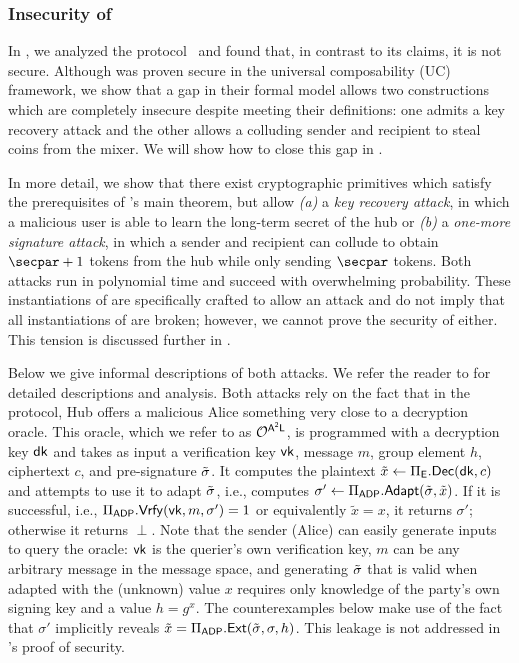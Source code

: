 \subsubsection{Insecurity of \texorpdfstring{\AAL}{A2L}}\label{sec:a2l-attacks}

In \cite{CCS:GMMMTT22}, we analyzed the \AAL protocol~\cite{SP:TaiMorMaf21} and found that, in contrast to its claims, it is not secure. Although \AAL was proven secure in the universal composability (UC)~\cite{FOCS:Canetti01} framework, we show that a gap in their formal model allows two constructions which are completely insecure despite meeting their definitions: one admits a key recovery attack and the other allows a colluding sender and recipient to steal coins from the mixer. We will show how to close this gap in .

In more detail, we show that there exist cryptographic primitives which satisfy the prerequisites of \AAL's main theorem, but allow \textit{(a)} a \emph{key recovery attack}, in which a malicious user is able to learn the long-term secret of the hub or \textit{(b)} a \emph{one-more signature attack}, in which a sender and recipient can collude to obtain $\secpar+1$ tokens from the hub while only sending $\secpar$ tokens. Both attacks run in polynomial time and succeed with overwhelming probability. These instantiations of \AAL are specifically crafted to allow an attack and do not imply that all instantiations of \AAL are broken; however, we cannot prove the security of \AAL either. This tension is discussed further in .

Below we give informal descriptions of both attacks. We refer the reader to \cite{CCS:GMMMTT22} for detailed descriptions and analysis. Both attacks rely on the fact that in the \AAL protocol, Hub offers a malicious Alice something very close to a decryption oracle. This oracle, which we refer to as $\mathcal{O}^{\sf A^2L}$, is programmed with a decryption key $\mathsf{dk}$ and takes as input a verification key $\mathsf{vk}$, message $m$, group element $h$, ciphertext $c$, and pre-signature $\tilde{\sigma}$. It computes the plaintext $\tilde{x} \gets \Pi_{\mathsf{E}}.\mathsf{Dec}(\mathsf{dk}, c)$ and attempts to use it to adapt $\tilde{\sigma}$, i.e., computes $\sigma' \gets \Pi_{\mathsf{ADP}}.\mathsf{Adapt}(\tilde{\sigma}, \tilde{x})$. If it is successful, i.e., $\Pi_{\mathsf{ADP}}.\mathsf{Vrfy}(\mathsf{vk}, m, \sigma') = 1$ or equivalently $\tilde{x} = x$, it returns $\sigma'$; otherwise it returns $\perp$. Note that the sender (Alice) can easily generate inputs to query the oracle: $\mathsf{vk}$ is the querier's own verification key, $m$ can be any arbitrary message in the message space, and generating $\tilde{\sigma}$ that is valid when adapted with the (unknown) value $x$ requires only knowledge of the party's own signing key and a value $h = g^x$. The counterexamples below make use of the fact that $\sigma'$ implicitly reveals $\tilde{x} = \Pi_{\mathsf{ADP}}.\mathsf{Ext}(\tilde{\sigma}, \sigma, h)$. This leakage is not addressed in \AAL's proof of security.

